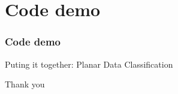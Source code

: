 \documentclass{beamer}
\begin{document}
\section{Code demo}
\begin{frame}
	\frametitle{Code demo}
\center 
Puting it together: Planar Data Classification
\end{frame}

\begin{frame}
	\center 
	Thank you
\end{frame}

\begin{frame}


\end{frame}
\end{document}

